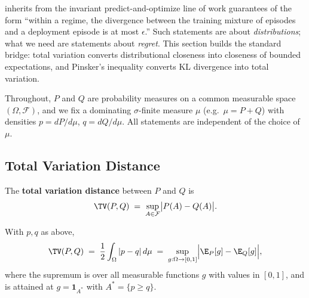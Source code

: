 \nm{} inherits from the invariant predict-and-optimize line of work
\cite{yan2026invpnco} guarantees of the form ``within a regime, the
divergence between the training mixture of episodes and a deployment episode
is at most $\epsilon$.'' Such statements are about \emph{distributions}; what
we need are statements about \emph{regret}. This section builds the standard
bridge: total variation converts distributional closeness into closeness of
bounded expectations, and Pinsker's inequality converts KL divergence into
total variation.

Throughout, $P$ and $Q$ are probability measures on a common measurable space
$(\Omega, \mathcal{F})$, and we fix a dominating $\sigma$-finite measure
$\mu$ (e.g.\ $\mu = P + Q$) with densities $p = dP/d\mu$, $q = dQ/d\mu$. All
statements are independent of the choice of $\mu$.

\subsection{Total Variation Distance}

\begin{definition}
\label{def:dd1-tv}
The \textbf{total variation distance} between $P$ and $Q$ is
\begin{equation}
\label{eq:dd1-tv-def}
\TV(P, Q) \;=\; \sup_{A \in \mathcal{F}} \bigl| P(A) - Q(A) \bigr|.
\end{equation}
\end{definition}

\begin{proposition}
\label{prop:dd1-tv-variational}
With $p, q$ as above,
\begin{equation}
\label{eq:dd1-tv-three}
\TV(P, Q)
\;=\; \frac{1}{2} \int_\Omega |p - q| \, d\mu
\;=\; \sup_{g : \Omega \to [0, 1]} \Bigl| \E_P[g] - \E_Q[g] \Bigr|,
\end{equation}
where the supremum is over all measurable functions $g$ with values in
$[0,1]$, and is attained at $g = \mathbf{1}_{A^*}$ with
$A^* = \{p \ge q\}$.
\end{proposition}

